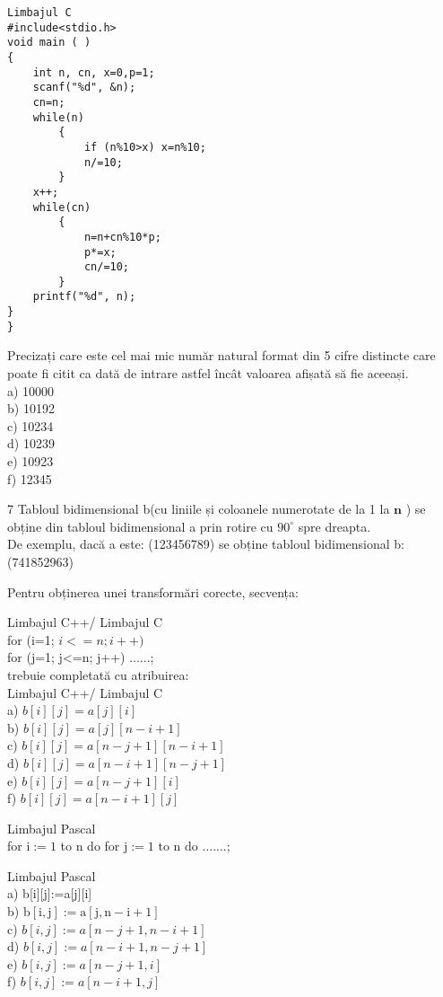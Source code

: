 \begin{verbatim}
Limbajul C
#include<stdio.h>
void main ( )
{
    int n, cn, x=0,p=1;
    scanf("%d", &n);
    cn=n;
    while(n)
        {
            if (n%10>x) x=n%10;
            n/=10;
        }
    x++;
    while(cn)
        {
            n=n+cn%10*p;
            p*=x;
            cn/=10;
        }
    printf("%d", n);
}
}
\end{verbatim}

Precizați care este cel mai mic număr natural format din 5 cifre distincte care poate fi citit ca dată de intrare astfel încât valoarea afișată să fie aceeași.\\
a) 10000\\
b) 10192\\
c) 10234\\
d) 10239\\
e) 10923\\
f) 12345

7 Tabloul bidimensional b(cu liniile și coloanele numerotate de la 1 la $\mathbf{n}$ ) se obține din tabloul bidimensional a prin rotire cu $90^{\circ}$ spre dreapta.\\
De exemplu, dacă a este: (123456789) se obține tabloul bidimensional b:\\
(741852963)

Pentru obținerea unei transformări corecte, secvența:

Limbajul C++/ Limbajul C\\
for (i=1; $i<=n ; i++)$\\
for (j=1; j<=n; j++) ......;\\
trebuie completată cu atribuirea:\\
Limbajul C++/ Limbajul C\\
a) $b[i][j]=a[j][i]$\\
b) $b[i][j]=a[j][n-i+1]$\\
c) $b[i][j]=a[n-j+1][n-i+1]$\\
d) $b[i][j]=a[n-i+1][n-j+1]$\\
e) $b[i][j]=a[n-j+1][i]$\\
f) $b[i][j]=a[n-i+1][j]$

Limbajul Pascal\\
for $\mathrm{i}:=1$ to n do for $\mathrm{j}:=1$ to n do .......;

Limbajul Pascal\\[0pt]
a) b[i][j]:=a[j][i]\\
b) $\mathrm{b}[\mathrm{i}, \mathrm{j}]:=\mathrm{a}[\mathrm{j}, \mathrm{n}-\mathrm{i}+1]$\\
c) $b[i, j]:=a[n-j+1, n-i+1]$\\
d) $b[i, j]:=a[n-i+1, n-j+1]$\\
e) $b[i, j]:=a[n-j+1, i]$\\
f) $b[i, j]:=a[n-i+1, j]$

